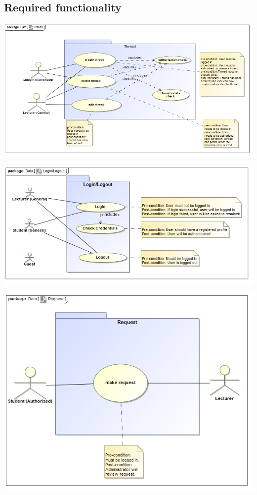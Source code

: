\documentclass[12pt, oneside]{article}
\begin{document}
	\subsection{Required functionality}
	\begin{center}

			 \includegraphics[scale=0.5]{thread}
			 
			 \includegraphics[scale=0.5]{Login_Logout} 
			 
			 \includegraphics[scale=0.45]{Request}


\end{center}
\end{document}

